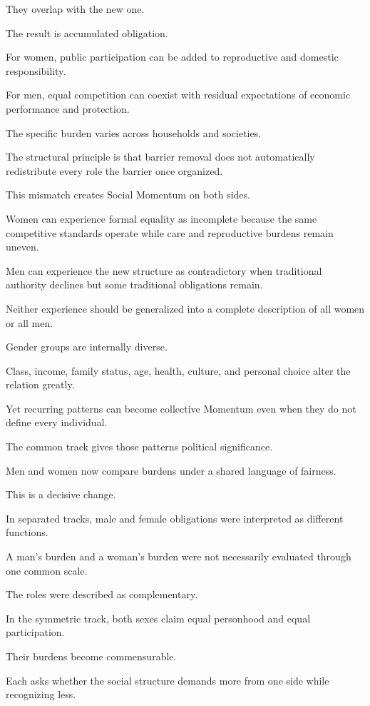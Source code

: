 They overlap with the new one.

The result is accumulated obligation.

For women, public participation can be added to reproductive and domestic responsibility.

For men, equal competition can coexist with residual expectations of economic performance and protection.

The specific burden varies across households and societies.

The structural principle is that barrier removal does not automatically redistribute every role the barrier once organized.

This mismatch creates Social Momentum on both sides.

Women can experience formal equality as incomplete because the same competitive standards operate while care and reproductive burdens remain uneven.

Men can experience the new structure as contradictory when traditional authority declines but some traditional obligations remain.

Neither experience should be generalized into a complete description of all women or all men.

Gender groups are internally diverse.

Class, income, family status, age, health, culture, and personal choice alter the relation greatly.

Yet recurring patterns can become collective Momentum even when they do not define every individual.

The common track gives those patterns political significance.

Men and women now compare burdens under a shared language of fairness.

This is a decisive change.

In separated tracks, male and female obligations were interpreted as different functions.

A man’s burden and a woman’s burden were not necessarily evaluated through one common scale.

The roles were described as complementary.

In the symmetric track, both sexes claim equal personhood and equal participation.

Their burdens become commensurable.

Each asks whether the social structure demands more from one side while recognizing less.

